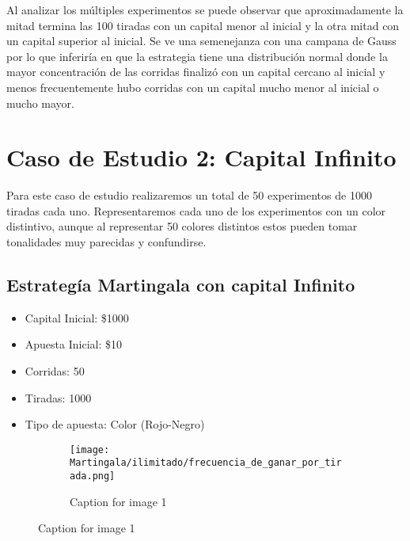 \documentclass{article}
\begin{document}
Al analizar los múltiples experimentos se puede observar que aproximadamente la mitad termina las 100 tiradas con un capital menor al inicial y la otra mitad con un capital superior al inicial. Se ve una semenejanza con una campana de Gauss por lo que inferiría en que la estrategia tiene una distribución normal donde la mayor concentración de las corridas finalizó con un capital cercano al inicial y menos frecuentemente hubo corridas con un capital mucho menor al inicial o mucho mayor.

\section{Caso de Estudio 2: Capital Infinito}

Para este caso de estudio realizaremos un total de 50 experimentos de 1000 tiradas cada uno. Representaremos cada uno de los experimentos con un color distintivo, aunque al representar 50 colores distintos estos pueden tomar tonalidades muy parecidas y confundirse.

\subsection{Estrategía Martingala con capital Infinito}
\begin{itemize}[noitemsep]
\item Capital Inicial: \$1000
\item Apuesta Inicial: \$10
\item Corridas: 50
\item Tiradas: 1000
\item Tipo de apuesta: Color (Rojo-Negro)
\end{itemize}

\clearpage

\begin{figure}[H] %
    \centering
    \begin{subfigure}[b]{0.45\textwidth}
        \texttt{[image: Martingala/ilimitado/frecuencia\_de\_ganar\_por\_tirada.png]}
        \caption{Caption for image 1}
        \label{fig:image1}
    \end{subfigure}
\end{figure}
\end{document}
